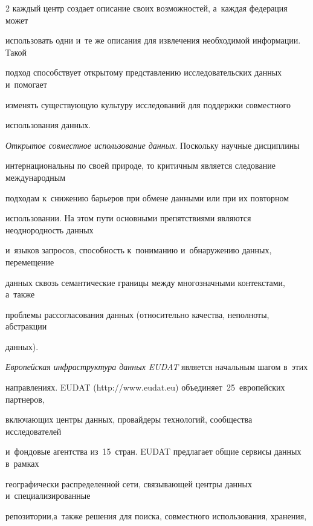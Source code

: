 \begin{multicols}{2}
каждый центр создает описание своих возможностей, а~каждая федерация может 


использовать одни и~те же описания для извлечения необходимой информации. Такой 


подход способствует открытому представлению исследовательских данных и~помогает 


изменять существующую культуру исследований для поддержки совместного 


использования данных. 







  


  \textit{Открытое совместное использование данных}. Поскольку научные дисциплины 


интернациональны по своей природе, то критичным является следование международным 


подходам к~снижению барь\-е\-ров при обмене данными или при их повторном\linebreak 


использовании. На этом пути основными препятствиями являются неоднородность данных 


и~языков запросов, способность к~пониманию и~обнаружению данных, перемещение 


данных сквозь семантиче\-ские границы между многозначными контекстами, а~так\-же 


проблемы рассогласования данных (относительно качества, неполноты, абстракции 


данных).







  


  \textit{Европейская инфраструктура данных EUDAT} является начальным шагом в~этих 


направлениях. EUDAT ({\sf http://www.eudat.eu}) объединяет~25~европейских партнеров, 


включающих центры данных, провайдеры технологий, сообщества исследователей 


и~фондовые агентства из~15~стран. EUDAT предлагает общие сервисы данных в~рамках 


географически распределенной сети, связывающей цент\-ры данных и~специализированные 


репозитории,\linebreak а~также решения для поиска, совместного использования, хранения, 



\end{multicols}
